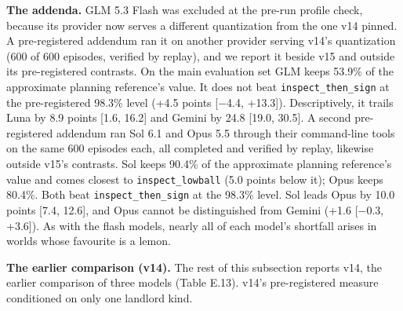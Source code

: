 \textbf{The addenda.} GLM 5.3 Flash was excluded at the pre-run profile check, because its provider now serves a different
quantization from the one v14 pinned. A pre-registered addendum ran it on another provider serving v14's quantization
(600 of 600 episodes, verified by replay), and we report it beside v15 and outside its pre-registered contrasts. On
the main evaluation set GLM keeps 53.9\% of the approximate planning reference's value. It does not beat \texttt{inspect\_\allowbreak{}then\_\allowbreak{}sign} at
the pre-registered 98.3\% level (+4.5 points {[}−4.4, +13.3{]}). Descriptively, it trails Luna by 8.9 points {[}1.6, 16.2{]}
and Gemini by 24.8 {[}19.0, 30.5{]}. A second pre-registered addendum ran Sol 6.1 and Opus 5.5 through their command-line
tools on the same 600 episodes each, all completed and verified by replay, likewise outside v15's contrasts. Sol keeps
90.4\% of the approximate planning reference's value and comes closest to \texttt{inspect\_\allowbreak{}lowball} (5.0 points below it); Opus keeps
80.4\%. Both beat \texttt{inspect\_\allowbreak{}then\_\allowbreak{}sign} at the 98.3\% level. Sol leads Opus by 10.0 points {[}7.4, 12.6{]}, and Opus cannot be
distinguished from Gemini (+1.6 {[}−0.3, +3.6{]}). As with the flash models, nearly all of each model's shortfall arises
in worlds whose favourite is a lemon.

\textbf{The earlier comparison (v14).} The rest of this subsection reports v14, the earlier comparison of three models
(Table E.13). v14's pre-registered measure conditioned on only one landlord kind.

